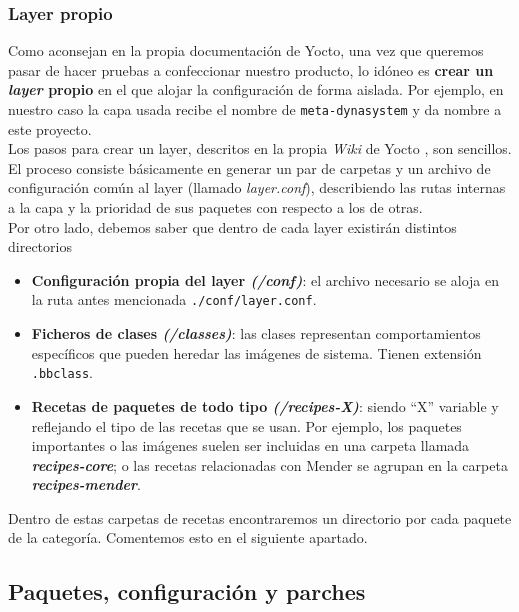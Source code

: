 \subsubsection{Layer propio}

Como aconsejan en la propia documentación de Yocto, una vez que queremos pasar de hacer pruebas a confeccionar nuestro producto, lo idóneo es \textbf{crear un \textit{layer} propio} en el que alojar la configuración de forma aislada. Por ejemplo, en nuestro caso la capa usada recibe el nombre de \texttt{meta-dynasystem} y da nombre a este proyecto.\\

Los pasos para crear un layer, descritos en la propia \textit{Wiki} de Yocto \cite{wiki-yocto-own-layer}, son sencillos. El proceso consiste básicamente en generar un par de carpetas y un archivo de configuración común al layer (llamado \textit{layer.conf}), describiendo las rutas internas a la capa y la prioridad de sus paquetes con respecto a los de otras.\\

Por otro lado, debemos saber que dentro de cada layer existirán distintos directorios 

\begin{itemize}
	\item \textbf{Configuración propia del layer \textit{(/conf)}}: el archivo necesario se aloja en la ruta antes mencionada \texttt{./conf/layer.conf}.
	\item \textbf{Ficheros de clases \textit{(/classes)}}: las clases representan comportamientos específicos que pueden heredar las imágenes de sistema. Tienen extensión \texttt{.bbclass}.
	\item \textbf{Recetas de paquetes de todo tipo \textit{(/recipes-X)}}: siendo ``X'' variable y reflejando el tipo de las recetas que se usan. Por ejemplo, los paquetes importantes o las imágenes suelen ser incluidas en una carpeta llamada \textbf{\textit{recipes-core}}; o las recetas relacionadas con Mender se agrupan en la carpeta \textbf{\textit{recipes-mender}}.
\end{itemize}

Dentro de estas carpetas de recetas encontraremos un directorio por cada paquete de la categoría. Comentemos esto en el siguiente apartado.\\

\subsection{Paquetes, configuración y parches}

